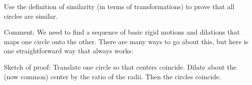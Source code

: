 \documentclass[nooutcomes]{ximera}
\begin{document}
%
%
%

%

\begin{question}
Use the definition of similarity (in terms of transformations) to prove that all circles are similar.  
\begin{freeResponse}
\begin{hint}
Comment: We need to find a sequence of basic rigid motions and dilations that maps one circle onto the other.  There are many ways to go about this, but here is one straightforward way that always works: 

Sketch of proof:  Translate one circle so that centers coincide.  Dilate about the (now common) center by the ratio of the radii.  Then the circles coincide.  
\end{hint}
\end{freeResponse}
\end{question}
\end{document}
